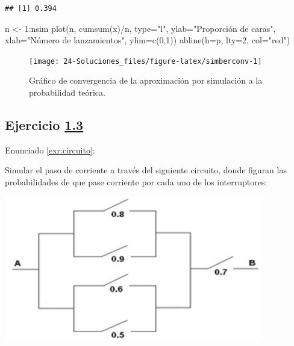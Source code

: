 \documentclass[
]{book}
\newenvironment{Shaded}{\begin{snugshade}}{\end{snugshade}}
\newcommand{\AttributeTok}[1]{\textcolor[rgb]{0.77,0.63,0.00}{#1}}
\newcommand{\DecValTok}[1]{\textcolor[rgb]{0.00,0.00,0.81}{#1}}
\newcommand{\FunctionTok}[1]{\textcolor[rgb]{0.00,0.00,0.00}{#1}}
\newcommand{\NormalTok}[1]{#1}
\newcommand{\OtherTok}[1]{\textcolor[rgb]{0.56,0.35,0.01}{#1}}
\newcommand{\SpecialCharTok}[1]{\textcolor[rgb]{0.00,0.00,0.00}{#1}}
\newcommand{\StringTok}[1]{\textcolor[rgb]{0.31,0.60,0.02}{#1}}
\theoremstyle{break}
\theoremstyle{nonumberplain}
\begin{document}
\begin{verbatim}
## [1] 0.394
\end{verbatim}

\begin{Shaded}
\begin{Highlighting}[]
\NormalTok{n }\OtherTok{\textless{}{-}} \DecValTok{1}\SpecialCharTok{:}\NormalTok{nsim}
\FunctionTok{plot}\NormalTok{(n, }\FunctionTok{cumsum}\NormalTok{(x)}\SpecialCharTok{/}\NormalTok{n, }\AttributeTok{type=}\StringTok{"l"}\NormalTok{, }\AttributeTok{ylab=}\StringTok{"Proporción de caras"}\NormalTok{, }
     \AttributeTok{xlab=}\StringTok{"Número de lanzamientos"}\NormalTok{, }\AttributeTok{ylim=}\FunctionTok{c}\NormalTok{(}\DecValTok{0}\NormalTok{,}\DecValTok{1}\NormalTok{))}
\FunctionTok{abline}\NormalTok{(}\AttributeTok{h=}\NormalTok{p, }\AttributeTok{lty=}\DecValTok{2}\NormalTok{, }\AttributeTok{col=}\StringTok{"red"}\NormalTok{)}
\end{Highlighting}
\end{Shaded}

\begin{figure}[!htb]

{\centering \texttt{[image: 24-Soluciones\_files/figure-latex/simberconv-1]} 

}

\caption{Gráfico de convergencia de la aproximación por simulación a la probabilidad teórica.}\label{fig:simberconv}
\end{figure}

\hypertarget{sol-circuito}{%
\subsection{\texorpdfstring{Ejercicio \href{ejercicios.html\#exr:circuito}{1.3}}{Ejercicio 1.3}}\label{sol-circuito}}

Enunciado \ref{exr:circuito}:

Simular el paso de corriente a través del siguiente circuito, donde
figuran las probabilidades de que pase corriente por cada uno de los
interruptores:

\begin{center}\includegraphics[width=0.5\linewidth]{images/circuito2} \end{center}
\end{document}
